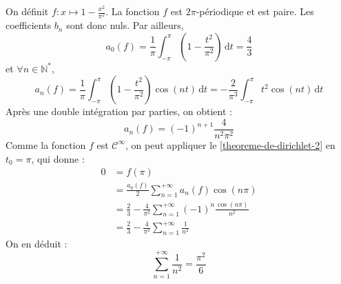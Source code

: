 	\begin{demonstration}
		On définit $f : x \mapsto 1 - \frac{x^2}{\pi^2}$. La fonction $f$ est $2\pi$-périodique et est paire. Les coefficients $b_n$ sont donc nuls. Par ailleurs,
		\[ a_0(f) = \frac{1}{\pi} \int_{-\pi}^{\pi} \left(1 - \frac{t^2}{\pi^2} \right) \, \mathrm{d}t = \frac{4}{3} \]
		et $\forall n \in \mathbb{N}^*$,
		\[ a_n(f) = \frac{1}{\pi} \int_{-\pi}^{\pi} \left(1 - \frac{t^2}{\pi^2} \right) \cos(nt) \, \mathrm{d}t = -\frac{2}{\pi^3} \int_{-\pi}^{\pi} t^2 \cos(nt) \, \mathrm{d}t \]
		Après une double intégration par parties, on obtient :
		\[ a_n(f) = (-1)^{n+1} \frac{4}{n^2 \pi^2} \]
		Comme la fonction $f$ est $\mathcal{C}^{\infty}$, on peut appliquer le \cref{theoreme-de-dirichlet-2} en $t_0 = \pi$, qui donne :
		\begin{align*}
			0 &= f(\pi) \\
			&= \frac{a_0(f)}{2} \sum_{n = 1}^{+\infty} a_n(f) \cos(n\pi) \\
			&= \frac{2}{3} - \frac{4}{\pi^2} \sum_{n = 1}^{+\infty} (-1)^n \frac{\cos(n\pi)}{n^2} \\
			&= \frac{2}{3} - \frac{4}{\pi^2} \sum_{n = 1}^{+\infty} \frac{1}{n^2}
		\end{align*}
		On en déduit :
		\[ \sum_{n=1}^{+\infty} \frac{1}{n^2} = \frac{\pi^2}{6} \]
	\end{demonstration}

